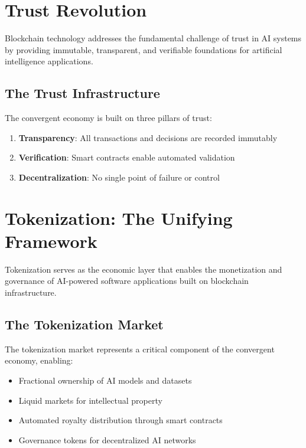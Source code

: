 \documentclass[11pt,a4paper]{report}
\begin{document}
\chapter{Trust Revolution}

Blockchain technology addresses the fundamental challenge of trust in AI systems by providing immutable, transparent, and verifiable foundations for artificial intelligence applications.

\section{The Trust Infrastructure}

The convergent economy is built on three pillars of trust:

\begin{enumerate}
\item \textbf{Transparency}: All transactions and decisions are recorded immutably
\item \textbf{Verification}: Smart contracts enable automated validation
\item \textbf{Decentralization}: No single point of failure or control
\end{enumerate}

\chapter{Tokenization: The Unifying Framework}

Tokenization serves as the economic layer that enables the monetization and governance of AI-powered software applications built on blockchain infrastructure.

\section{The Tokenization Market}

The tokenization market represents a critical component of the convergent economy, enabling:

\begin{itemize}
\item Fractional ownership of AI models and datasets
\item Liquid markets for intellectual property
\item Automated royalty distribution through smart contracts
\item Governance tokens for decentralized AI networks
\end{itemize}
\end{document}
